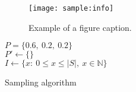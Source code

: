 \documentclass[conference]{IEEEtran}
\begin{document}
\begin{figure}[h]
    \texttt{[image: sample:info]}
    \caption{Example of a figure caption. \label{fig:sample:info}}
\end{figure}

\begin{algorithm}
    $P = \{0.6,\ 0.2,\ 0.2\}$\\
    $P' \gets \{\}$\\
    $I \gets \{x:\ 0\leq x\leq \lvert S\rvert,\ x\in\mathbb{N}\}$\\
    \caption{Sampling algorithm}\label{sampling:alg}
\end{algorithm}
\printbibliography
\end{document}
